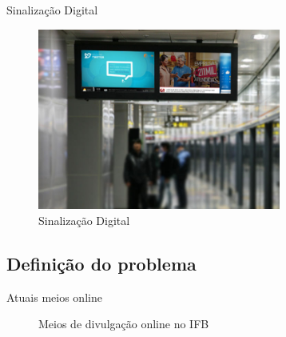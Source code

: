 \documentclass{aula-ifb}
\begin{document}
\begin{frame}{Sinalização Digital}
\begin{figure}[h]
\includegraphics[width=8cm]{figuras/sinalizacaodigital.png}
\caption{Sinalização Digital \cite{figura2}}
\label{fig:siteifb}
\end{figure}
\end{frame}

\subsection{Definição do problema}
\begin{frame}{Atuais meios online}
\begin{figure}[h]
  \centering
  \quad %
  \caption{Meios de divulgação online no IFB}
\label{fig1}
\end{figure}
\end{frame}
\end{document}
